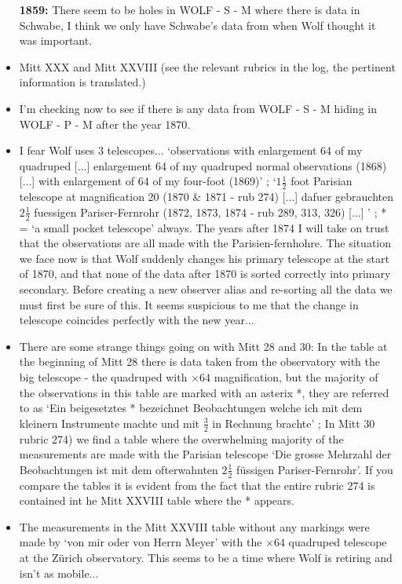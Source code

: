 \documentclass[12pt]{article}
\begin{document}
\begin{itemize}
 \item[\textbf{1859:}] There seem to be holes in WOLF - S - M where there is data in Schwabe, I think we only have Schwabe's data from when Wolf thought it was important.
    \item Mitt XXX and Mitt XXVIII (see the relevant rubrics in the log, the pertinent information is translated.)
    \item I'm checking now to see if there is any data from WOLF - S - M hiding in WOLF - P - M after the year 1870.
    \item I fear Wolf uses 3 telescopes... `observations with enlargement 64 of my quadruped [...] enlargement 64 of my quadruped normal observations (1868) [...] with enlargement of 64 of my four-foot (1869)' ; `$1 \frac{1}{2}$ foot Parisian telescope at magnification 20 (1870 & 1871 - rub 274) [...] dafuer gebrauchten $2\frac{1}{2}$ fuessigen Pariser-Fernrohr (1872, 1873, 1874 - rub 289, 313, 326) [...] ' ; * = `a small pocket telescope' always. The years after 1874 I will take on trust that the observations are all made with the Parisien-fernhohre. The situation we face now is that Wolf suddenly changes his primary telescope at the start of 1870, and that none of the data after 1870 is sorted correctly into primary secondary. Before creating a new observer alias and re-sorting all the data we must first be sure of this. It seems suspicious to me that the change in telescope coincides perfectly with the new year...
    \item There are some strange things going on with Mitt 28 and 30: In the table at the beginning of Mitt 28 there is data taken from the observatory with the big telescope - the quadruped with $\times 64$ magnification, but the majority of the observations in this table are marked with an asterix *, they are referred to as `Ein beigesetztes * bezeichnet Beobachtungen welche ich mit dem kleinern Instrumente machte und mit $\frac{3}{2}$ in Rechnung brachte' ; In Mitt 30 rubric 274) we find a table where the overwhelming majority of the measurements are made with the Parisian telescope `Die grosse Mehrzahl der Beobachtungen ist mit dem ofterwahnten $2\frac{1}{2}$ füssigen Pariser-Fernrohr'. If you compare the tables it is evident from the fact that the entire rubric 274 is contained int he Mitt XXVIII table where the * appears. 
    \item The measurements in the Mitt XXVIII table without any markings were made by `von mir oder von Herrn Meyer' with the $\times 64$ quadruped telescope at the Zürich observatory. This seems to be a time where Wolf is retiring and isn't as mobile...

\end{itemize}
\end{document}
